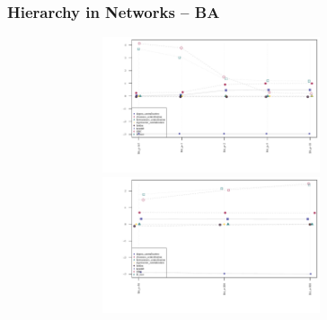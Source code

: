 \documentclass[xcolor={table}]{beamer}
\newenvironment{changemargin}[2]{%
  \begin{list}{}{%
    \setlength{\topsep}{0pt}%
    \setlength{\leftmargin}{#1}%
    \setlength{\rightmargin}{#2}%
    \setlength{\listparindent}{\parindent}%
    \setlength{\itemindent}{\parindent}%
    \setlength{\parsep}{\parskip}%
  }%
  \item[]}{\end{list}}
\begin{document}
\begin{frame}\frametitle{Hierarchy in Networks -- BA}
	\begin{changemargin}{-2cm}{ -2cm}
		\centering
		\includegraphics[width=12cm, height=4cm]{images/BA_Param_Averages.pdf}
		\\
		\includegraphics[width=12cm, height=4cm]{images/BA_Size_Averages.pdf}
	\end{changemargin}
\end{frame}
\end{document}
